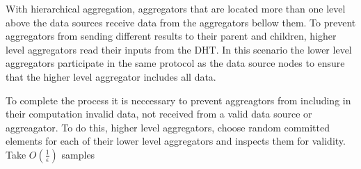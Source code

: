 \documentclass{article}
\begin{document}
With hierarchical aggregation, aggregators that are located more than
one level above the data sources receive data from the aggregators
bellow them. To prevent aggregators from sending different results to
their parent and children, higher level aggregators read their inputs
from the DHT. In this scenario the lower level aggregators participate
in the same protocol as the data source nodes to ensure that the
higher level aggregator includes all data. 

To complete the process it is neccessary to prevent aggreagtors from
including in their computation invalid data, not received from a valid data source or
aggreagator. To do this, higher level aggregators, choose random
committed elements for each of their lower level aggregators and
inspects them for validity. Take $O(\frac{1}{\epsilon})$ samples
\end{document}
